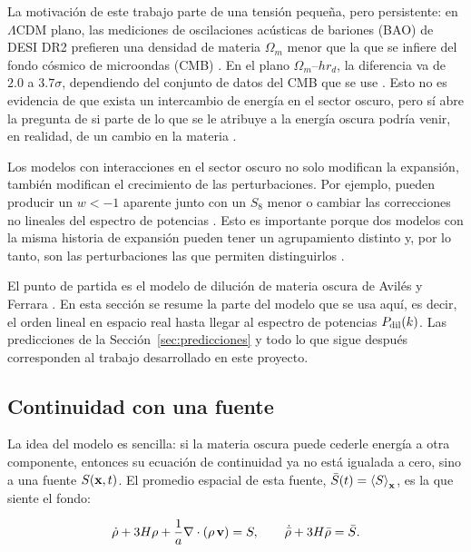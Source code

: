 \documentclass[letterpaper, 12pt]{article}
\newcommand{\LCDM}{\Lambda\mathrm{CDM}}
\begin{document}
            La motivación de este trabajo parte de una tensión pequeña, pero persistente: en $\LCDM$ plano, las mediciones de oscilaciones acústicas de bariones (BAO) de DESI DR2 prefieren una densidad de materia $\Omega_m$ menor que la que se infiere del fondo cósmico de microondas (CMB) \cite{desi_dr2, planck2018}. En el plano $\Omega_m$--$hr_d$, la diferencia va de $2.0$ a $3.7\sigma$, dependiendo del conjunto de datos del CMB que se use \cite{camphuis}. Esto no es evidencia de que exista un intercambio de energía en el sector oscuro, pero sí abre la pregunta de si parte de lo que se le atribuye a la energía oscura podría venir, en realidad, de un cambio en la materia \cite{chen_loeb, aviles_ferrara}.

            Los modelos con interacciones en el sector oscuro no solo modifican la expansión, también modifican el crecimiento de las perturbaciones. Por ejemplo, pueden producir un $w<-1$ aparente junto con un $S_8$ menor \cite{khoury2025, khoury2026} o cambiar las correcciones no lineales del espectro de potencias \cite{silva}. Esto es importante porque dos modelos con la misma historia de expansión pueden tener un agrupamiento distinto y, por lo tanto, son las perturbaciones las que permiten distinguirlos \cite{aviles_ferrara}.

            El punto de partida es el modelo de dilución de materia oscura de Avilés y Ferrara \cite{aviles_ferrara}. En esta sección se resume la parte del modelo que se usa aquí, es decir, el orden lineal en espacio real hasta llegar al espectro de potencias $P_{\rm dil}(k)$. Las predicciones de la Sección~\ref{sec:predicciones} y todo lo que sigue después corresponden al trabajo desarrollado en este proyecto.

        \subsection{Continuidad con una fuente}

            La idea del modelo es sencilla: si la materia oscura puede cederle energía a otra componente, entonces su ecuación de continuidad ya no está igualada a cero, sino a una fuente $S(\vb{x},t)$. El promedio espacial de esta fuente, $\bar S(t) = \expval{S}_{\vb{x}}$, es la que siente el fondo:

            \begin{equation}\label{eq:continuidad}
                \dot\rho + 3H\rho + \frac{1}{a}\nabla\cdot(\rho\,\vb{v}) = S, \qquad
                \dot{\bar\rho} + 3H\bar\rho = \bar S.
            \end{equation}
\end{document}
